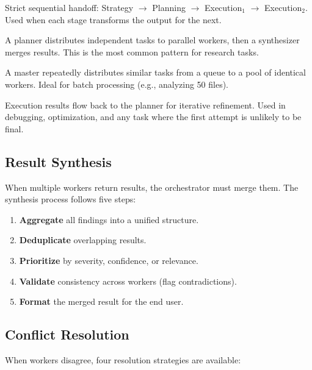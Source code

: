 \documentclass[11pt,letterpaper,twocolumn]{article}
\begin{document}
\begin{description}[leftmargin=0pt,itemsep=4pt]
  \item[Pipeline.] Strict sequential handoff: Strategy $\to$ Planning $\to$
    Execution$_1$ $\to$ Execution$_2$.  Used when each stage transforms the
    output for the next.

  \item[Fan-Out/Fan-In.] A planner distributes independent tasks to
    parallel workers, then a synthesizer merges results.  This is the most
    common pattern for research tasks.

  \item[Master-Worker.] A master repeatedly distributes similar tasks from
    a queue to a pool of identical workers.  Ideal for batch processing (e.g.,
    analyzing 50 files).

  \item[Feedback Loop.] Execution results flow back to the planner for
    iterative refinement.  Used in debugging, optimization, and any task
    where the first attempt is unlikely to be final.
\end{description}

\subsection{Result Synthesis}

When multiple workers return results, the orchestrator must merge them.  The
synthesis process follows five steps:

\begin{enumerate}[leftmargin=*,itemsep=1pt]
  \item \textbf{Aggregate} all findings into a unified structure.
  \item \textbf{Deduplicate} overlapping results.
  \item \textbf{Prioritize} by severity, confidence, or relevance.
  \item \textbf{Validate} consistency across workers (flag contradictions).
  \item \textbf{Format} the merged result for the end user.
\end{enumerate}

\subsection{Conflict Resolution}

When workers disagree, four resolution strategies are available:
\end{document}

